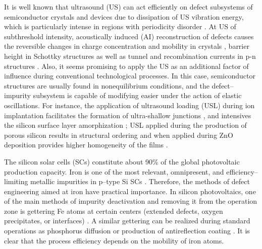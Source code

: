 \documentclass[sn-mathphys]{sn-jnl}%
\theoremstyle{thmstyleone}%
\theoremstyle{thmstyletwo}%
\theoremstyle{thmstylethree}%
\begin{document}
It is well known that ultrasound (US) can act efficiently on defect subsystems of semiconductor crystals and devices due to dissipation of US vibration energy, which is particularly intense in regions with periodicity disorder \cite{ostapenko2002,Savkina2013,Olikh2018JAP}.
At US of subthreshold intensity, acoustically induced (AI) reconstruction of defects causes the reversible changes in charge concentration and mobility in crystals \cite{Davletova2008,Olikh2020JEM},
barrier height in Schottky structures \cite{Olikh:Ultras,OlikhJAP}
as well as tunnel and recombination currents in p-n structures \cite{Teterkin2009,Olikh2018JAP}.
Also, it seems promising to apply the US as an additional factor of influence during conventional technological processes.
In this case, semiconductor structures are usually found in  nonequilibrium conditions, and the defect--impurity subsystem is capable of modifying easier under the action of elastic oscillations.
For instance, the application of ultrasound loading (USL) during ion implantation facilitates
the formation of ultra-shallow junctions \cite{USImplant:JVacSci},
and intensives the silicon surface layer amorphization \cite{RomanyukSST};
USL applied during the production of porous silicon  results in structural ordering \cite{Kalem2000}
and when applied during ZnO deposition provides higher homogeneity of the films \cite{US:ZnOfilm}.

The silicon solar cells (SCs) constitute about 90\% of the global photovoltaic production capacity.
Iron is one of the most relevant, omnipresent, and efficiency--limiting metallic impurities
in p--type Si SCs \cite{Istratov1999,IronSC}.
Therefore, the methods of defect engineering aimed at iron have practical importance.
In silicon photovoltaics, one of the main methods of impurity deactivation and removing it from the operation zone is gettering Fe atoms at certain centers (extended defects, oxygen precipitates, or interfaces) \cite{LaineIEEEPV2016}.
A similar gettering can be realized during standard operations as phosphorus diffusion  \cite{FeB:Vahanissi}
or production of antireflection coating  \cite{Teimuraz2014JAP}.
It is clear that the process efficiency depends on the mobility of iron atoms.
\end{document}
